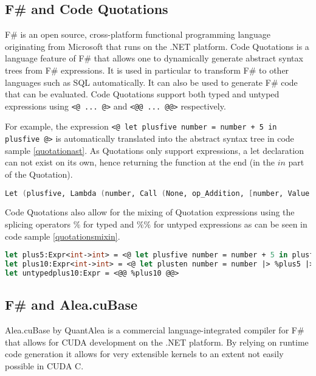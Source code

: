\subsection{F\# and Code Quotations}\label{subsec:background:codequotations}
F\#\cite{fsharp} is an open source, cross-platform functional programming language originating from Microsoft that runs on the .NET platform.
Code Quotations is a language feature of F\# that allows one to dynamically generate abstract syntax trees from F\# expressions. 
It is used in particular to transform F\# to other languages such as SQL automatically. 
It can also be used to generate F\# code that can be evaluated. 
Code Quotations support both typed and untyped expressions using \lstinline$<@ ... @>$ and \lstinline$<@@ ... @@>$ respectively. 

For example, the expression \lstinline$<@ let plusfive number = number + 5 in plusfive @>$ is automatically translated into the abstract syntax tree in code sample \ref{quotationast}. 
As Quotations only support expressions, a let declaration can not exist on its own, hence returning the function at the end (in the $in$ part of the Quotation).
\begin{lstlisting}[language=FSharp, caption=Abstract syntax tree for the example Quotation expression, label=quotationast]
Let (plusfive, Lambda (number, Call (None, op_Addition, [number, Value (5)])), plusfive)
\end{lstlisting}

Code Quotations also allow for the mixing of Quotation expressions using the splicing operators $\%$ for typed and $\%\%$ for untyped expressions as can be seen in code sample \ref{quotationsmixin}.

\begin{lstlisting}[caption=Quotation mixing, label=quotationsmixin, language=FSharp]
let plus5:Expr<int->int> = <@ let plusfive number = number + 5 in plusfive @>
let plus10:Expr<int->int> = <@ let plusten number = number |> %plus5 |> %plus5 in plusten @>
let untypedplus10:Expr = <@@ %plus10 @@>
\end{lstlisting}


\subsection{F\# and Alea.cuBase}\label{subsec:background:fsharpcubase}
Alea.cuBase by QuantAlea\cite{quantalea} is a commercial language-integrated compiler for F\# that allows for CUDA development on the .NET platform.
By relying on runtime code generation it allows for very extensible kernels to an extent not easily possible in CUDA C.

